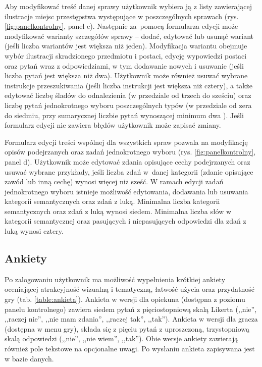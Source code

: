         Aby modyfikować treść danej sprawy użytkownik wybiera ją z listy zawierającej ilustracje miejsc przestępstwa występujące w poszczególnych sprawach (rys. \ref{fig:panelkontrolny}, panel c).
        Następnie za~pomocą formularza edycji może modyfikować warianty szczegółów sprawy -- dodać, edytować lub usunąć wariant (jeśli liczba wariantów jest większa niż jeden).
        Modyfikacja wariantu obejmuje wybór ilustracji skradzionego przedmiotu i postaci, edycję wypowiedzi postaci oraz pytań wraz z odpowiedziami, w tym dodawanie nowych i usuwanie (jeśli liczba pytań jest większa niż dwa).
        Użytkownik może również usuwać wybrane instrukcje przeszukiwania (jeśli liczba instrukcji jest większa niż cztery), a także edytować liczbę śladów do odnalezienia (w przedziale od trzech do sześciu) oraz liczbę pytań jednokrotnego wyboru poszczególnych typów (w przedziale od zera do siedmiu, przy sumarycznej liczbie pytań wynoszącej minimum dwa ).
        Jeśli formularz edycji nie zawiera błędów użytkownik może zapisać zmiany.
        
        Formularz edycji treści wspólnej dla wszystkich spraw pozwala na modyfikację opisów podejrzanych oraz zadań jednokrotnego wyboru (rys. \ref{fig:panelkontrolny}, panel d).
        Użytkownik może edytować zdania opisujące cechy podejrzanych oraz usuwać wybrane przykłady, jeśli liczba zdań w~danej kategorii (zdanie opisujące zawód lub inną cechę) wynosi więcej niż sześć.
        W ramach edycji zadań jednokrotnego wyboru istnieje możliwość edytowania, dodawania lub usuwania kategorii semantycznych oraz zdań z luką.
        Minimalna liczba kategorii semantycznych oraz zdań z luką wynosi siedem.
        Minimalna liczba słów w kategorii semantycznej oraz pasujących i niepasujących odpowiedzi dla zdań z luką wynosi cztery.

    \subsection{Ankiety}
        Po zalogowaniu użytkownik ma możliwość wypełnienia krótkiej ankiety oceniającej atrakcyjność wizualną i tematyczną, łatwość użycia oraz przydatność gry (tab. \ref{table:ankieta}).
        Ankieta w wersji dla opiekuna (dostępna z poziomu panelu kontrolnego) zawiera siedem pytań z pięciostopniową skalą Likerta (,,nie'', ,,raczej nie'', ,,nie mam zdania'', ,,raczej tak'', ,,tak'').
        Ankieta w wersji dla gracza (dostępna w menu gry), składa się z pięciu pytań z uproszczoną, trzystopniową skalą odpowiedzi (,,nie'', ,,nie wiem'', ,,tak'').
        Obie wersje ankiety zawierają również pole tekstowe na opcjonalne uwagi.
        Po wysłaniu ankieta zapisywana jest w bazie danych.

